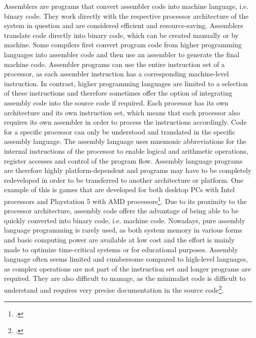 Assemblers are programs that convert assembler code into machine language, i.e. binary code. They work directly with the respective processor architecture of the system in question and are considered efficient and resource-saving. Assemblers translate code directly into binary code, which can be created manually or by machine. Some compilers first convert program code from higher programming languages into assembler code and then use an assembler to generate the final machine code.
Assembler programs can use the entire instruction set of a processor, as each assembler instruction has a corresponding machine-level instruction. In contrast, higher programming languages are limited to a selection of these instructions and therefore sometimes offer the option of integrating assembly code into the source code if required.
Each processor has its own architecture and its own instruction set, which means that each processor also requires its own assembler in order to process the instructions accordingly. Code for a specific processor can only be understood and translated in the specific assembly language. The assembly language uses mnemonic abbreviations for the internal instructions of the processor to enable logical and arithmetic operations, register accesses and control of the program flow. Assembly language programs are therefore highly platform-dependent and programs may have to be completely redeveloped in order to be transferred to another architecture or platform. One example of this is games that are developed for both desktop PCs with Intel processors and Playstation 5 with AMD processors\footcite{augsten_was_2018}.
Due to its proximity to the processor architecture, assembly code offers the advantage of being able to be quickly converted into binary code, i.e. machine code. 
Nowadays, pure assembly language programming is rarely used, as both system memory in various forms and basic computing power are available at low cost and the effort is mainly made to optimize time-critical systems or for educational purposes. Assembly language often seems limited and cumbersome compared to high-level languages, as complex operations are not part of the instruction set and longer programs are required. They are also difficult to manage, as the minimalist code is difficult to understand and requires very precise documentation in the source code\footcite{augsten_was_2018}.